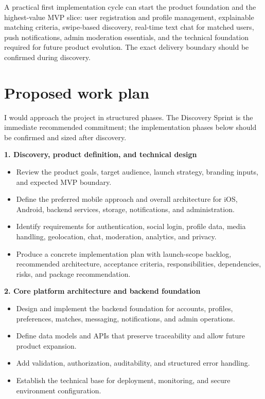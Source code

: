 \documentclass[11pt,a4paper]{article}
\begin{document}
A practical first implementation cycle can start the product foundation and the highest-value MVP slice: user registration and profile management, explainable matching criteria, swipe-based discovery, real-time text chat for matched users, push notifications, admin moderation essentials, and the technical foundation required for future product evolution. The exact delivery boundary should be confirmed during discovery.\par

\section*{Proposed work plan}

I would approach the project in structured phases. The Discovery Sprint is the immediate recommended commitment; the implementation phases below should be confirmed and sized after discovery.\par

\textbf{1. Discovery, product definition, and technical design}\par

\begin{itemize}
\item Review the product goals, target audience, launch strategy, branding inputs, and expected MVP boundary.
\item Define the preferred mobile approach and overall architecture for iOS, Android, backend services, storage, notifications, and administration.
\item Identify requirements for authentication, social login, profile data, media handling, geolocation, chat, moderation, analytics, and privacy.
\item Produce a concrete implementation plan with launch-scope backlog, recommended architecture, acceptance criteria, responsibilities, dependencies, risks, and package recommendation.
\end{itemize}

\textbf{2. Core platform architecture and backend foundation}\par

\begin{itemize}
\item Design and implement the backend foundation for accounts, profiles, preferences, matches, messaging, notifications, and admin operations.
\item Define data models and APIs that preserve traceability and allow future product expansion.
\item Add validation, authorization, auditability, and structured error handling.
\item Establish the technical base for deployment, monitoring, and secure environment configuration.
\end{itemize}
\end{document}
